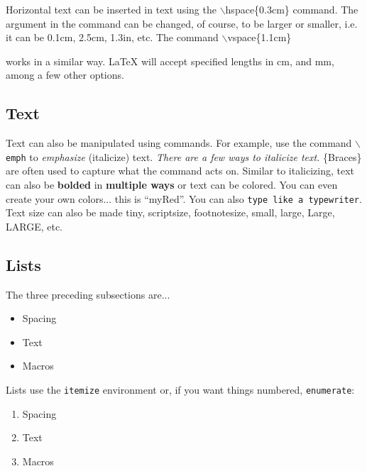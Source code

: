 \documentclass[11pt]{article} %
\begin{document}
Horizontal text can be inserted in text using the $\backslash$hspace\{0.3cm\} \hspace{0.3cm} command. %
The argument in the command can be changed, of course, to be larger or smaller, i.e. it can be 0.1cm, 2.5cm, 1.3in, etc. The command $\backslash$vspace\{1.1cm\} \\
\vspace{1.1cm}

\noindent works in a similar way. LaTeX will accept specified lengths in cm, and mm, among a few other options.

\subsection{Text}

Text can also be manipulated using commands. For example, use the command \texttt{$\backslash$emph} to \emph{emphasize} (italicize) text. {\em There are a few ways to italicize text.} \{Braces\} are often used to capture what the command acts on. Similar to italicizing, text can also be \textbf{bolded} in {\bfseries multiple ways} or text can be {\color{red} colored}. You can even create your own colors...
{\color{myRed}this is ``myRed''}. %
You can also \texttt{type like a typewriter}. \\

Text size can also be made {\tiny tiny}, {\scriptsize scriptsize}, {\footnotesize footnotesize}, {\small small}, {\large large}, {\Large Large}, {\LARGE LARGE}, etc. \\

\subsection{Lists}

The three preceding subsections are...
\begin{itemize}
\item Spacing
\item Text
\item Macros
\end{itemize}
Lists use the \texttt{itemize} environment or, if you want things numbered, \texttt{enumerate}:
\begin{enumerate}
\item Spacing
\item Text
\item Macros
\end{enumerate}
\end{document}
